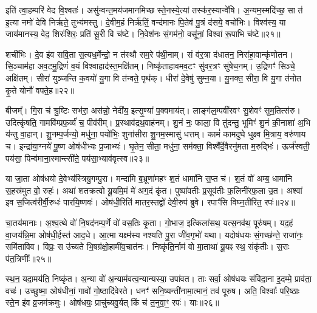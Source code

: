 इति॑ त्वा॒हम्परि॑ वेद वि॒श्वतः॑। असु॑न्वन्त॒मय॑जमानमिच्छ स्ते॒नस्ये॒त्यां तस्क॑र॒स्यान्वे॑षि। अ॒न्यम॒स्मदि॑च्छ॒ सा त॑ इ॒त्या नमो॑ देवि निर्\mbox{}ऋते॒ तुभ्य॑मस्तु। दे॒वीम॒हं निर्\mbox{}ऋ॑तिं॒ वन्द॑मानः पि॒तेव॑ पु॒त्रं द॑सये॒ वचो॑भिः। विश्व॑स्य॒ या जाय॑मानस्य॒ वेद॒ शिरः॑शिरः॒ प्रति॑ सू॒री वि च॑ष्टे। नि॒वेश॑नः सं॒गम॑नो॒ वसू॑नां॒ विश्वा॑ रू॒पाभि च॑ष्टे॥२१॥

शची॑भिः। दे॒व इ॑व सवि॒ता स॒त्यध॒र्मेन्द्रो॒ न त॑स्थौ सम॒रे प॑थी॒नाम्। सं व॑र॒त्रा द॑धातन॒ निरा॑हा॒वान्कृ॑णोतन। सि॒ञ्चाम॑हा अव॒टमु॒द्रिणं॑ व॒यं विश्वाहाद॑स्त॒मक्षि॑तम्। निष्कृ॑ताहावमव॒टꣳ सु॑वर॒त्रꣳ सु॑षेच॒नम्। उ॒द्रिणꣳ॑ सिञ्चे॒ अक्षि॑तम्। सीरा॑ युञ्जन्ति क॒वयो॑ यु॒गा वि त॑न्वते॒ पृथ॑क्। धीरा॑ दे॒वेषु॑ सुम्न॒या। यु॒नक्त॒ सीरा॒ वि यु॒गा त॑नोत कृ॒ते योनौ॑ वपते॒ह॥२२॥

बीजम्᳚। गि॒रा च॑ श्रु॒ष्टिः सभ॑रा॒ अस॑न्नो॒ नेदी॑य॒ इत्सृ॒ण्या॑ प॒क्वमाय॑त्। लाङ्ग॑ल॒म्पवी॑रवꣳ सु॒शेवꣳ॑ सुम॒तित्स॑रु। उदित्कृ॑षति॒ गामवि॑म्प्रफ॒र्व्यं॑ च॒ पीव॑रीम्। प्र॒स्थाव॑द्रथ॒वाह॑नम्। शु॒नं नः॒ फाला॒ वि तु॑दन्तु॒ भूमिꣳ॑ शु॒नं की॒नाशा॑ अ॒भि य॑न्तु वा॒हान्। शु॒नम्प॒र्जन्यो॒ मधु॑ना॒ पयो॑भिः॒ शुना॑सीरा शु॒नम॒स्मासु॑ धत्तम्। कामं॑ कामदुघे धुक्ष्व मि॒त्राय॒ वरु॑णाय च। इन्द्रा॑या॒ग्नये॑ पू॒ष्ण ओष॑धीभ्यः प्र॒जाभ्यः॑। घृ॒तेन॒ सीता॒ मधु॑ना॒ सम॑क्ता॒ विश्वै᳚र्दे॒वैरनु॑मता म॒रुद्भिः॑। ऊर्ज॑स्वती॒ पय॑सा॒ पिन्व॑माना॒स्मान्त्सी॑ते॒ पय॑सा॒भ्याव॑वृत्स्व॥२३॥

{\anuvakamend[{समो॑कसौ विश्वरूपे वि॒दुर्निर्\mbox{}ऋ॑तिर॒भि च॑ष्ट इ॒ह मि॒त्राय॒ द्वाविꣳ॑शतिश्च॥५॥}]}

या जा॒ता ओष॑धयो दे॒वेभ्य॑स्त्रियु॒गम्पु॒रा। मन्दा॑मि ब॒भ्रूणा॑महꣳ श॒तं धामा॑नि स॒प्त च॑। श॒तं वो॑ अम्ब॒ धामा॑नि स॒हस्र॑मुत वो॒ रुहः॑। अथा॑ शतक्रत्वो यू॒यमि॒मं मे॑ अग॒दं कृ॑त। पुष्पा॑वतीः प्र॒सूव॑तीः फ॒लिनी॑रफ॒ला उ॒त। अश्वा॑ इव स॒जित्व॑रीर्वी॒रुधः॑ पारयि॒ष्णवः॑। ओष॑धी॒रिति॑ मातर॒स्तद्वो॑ देवी॒रुप॑ ब्रुवे। रपाꣳ॑सि विघ्न॒तीरि॑त॒ रपः॑॥२४॥

चा॒तय॑मानाः। अ॒श्व॒त्थे वो॑ नि॒षद॑नम्प॒र्णे वो॑ वस॒तिः कृ॒ता। गो॒भाज॒ इत्किला॑सथ॒ यत्स॒नव॑थ॒ पूरु॑षम्। यद॒हं वा॒जय॑न्नि॒मा ओष॑धी॒र्\mbox{}हस्त॑ आद॒धे। आ॒त्मा यक्ष्म॑स्य नश्यति पु॒रा जी॑व॒गृभो॑ यथा। यदोष॑धयः सं॒गच्छ॑न्ते॒ राजा॑नः॒ समि॑ताविव। विप्रः॒ स उ॑च्यते भि॒षग्र॑क्षो॒हामी॑व॒चात॑नः। निष्कृ॑ति॒र्नाम॑ वो मा॒ताथा॑ यू॒यꣴ स्थ॒ संकृ॑तीः। स॒राः प॑त॒त्रिणीः᳚॥२५॥

स्थ॒न॒ यदा॒मय॑ति॒ निष्कृ॑त। अ॒न्या वो॑ अ॒न्याम॑वत्व॒न्यान्यस्या॒ उपा॑वत। ताः सर्वा॒ ओष॑धयः संविदा॒ना इ॒दम्मे॒ प्राव॑ता॒ वचः॑। उच्छुष्मा॒ ओष॑धीनां॒ गावो॑ गो॒ष्ठादि॑वेरते। धनꣳ॑ सनि॒ष्यन्ती॑नामा॒त्मानं॒ तव॑ पूरुष। अति॒ विश्वाः᳚ परि॒ष्ठाः स्ते॒न इ॑व व्र॒जम॑क्रमुः। ओष॑धयः॒ प्राचु॑च्यवु॒र्यत् किं च॑ त॒नुवा॒ꣳ॒ रपः॑। याः॥२६॥

